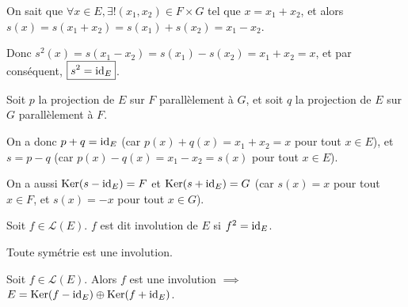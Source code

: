 \documentclass[12pt, a4paper]{report}
\begin{document}
\begin{remark}
    On sait que $\forall x \in E, \exists! (x_1,x_2) \in F \times G$ tel que $x = x_1 + x_2$, et alors $s(x) = s(x_1 + x_2) = s(x_1) + s(x_2) = x_1 - x_2$.

    Donc $s^2(x) = s(x_1 - x_2) = s(x_1) - s(x_2) = x_1 + x_2 = x$, et par conséquent, $\boxed{s^2 = \mathrm{id}_E}$.
\end{remark}

\begin{remark}
    Soit $p$ la projection de $E$ sur $F$ parallèlement à $G$, et soit $q$ la projection de $E$ sur $G$ parallèlement à $F$.

    On a donc $p+q = \mathrm{id}_E$ (car $p(x) + q(x) = x_1 + x_2 = x$ pour tout $x \in E$), et $\boxed{s = p - q}$ (car $p(x) - q(x) = x_1 - x_2 = s(x)$ pour tout $x \in E$).
\end{remark}

\begin{remark}
    On a aussi $\mathrm{Ker}(s-\mathrm{id}_E) = F$ et $\mathrm{Ker}(s+\mathrm{id}_E) = G$ (car $s(x) = x$ pour tout $x \in F$, et $s(x) = -x$ pour tout $x \in G$).
\end{remark}

\begin{definition}[Involution]
    Soit $f \in \mathcal L(E)$. $f$ est dit involution de $E$ si $f^2 = \mathrm{id}_E$.
\end{definition}

\begin{remark}
    Toute symétrie est une involution.
\end{remark}

\begin{property}
    Soit $f \in \mathcal L(E)$. Alors $f$ est une involution $\implies$ $E = \mathrm{Ker}(f - \mathrm{id}_E) \oplus \mathrm{Ker}(f + \mathrm{id}_E)$.
\end{property}
\end{document}
